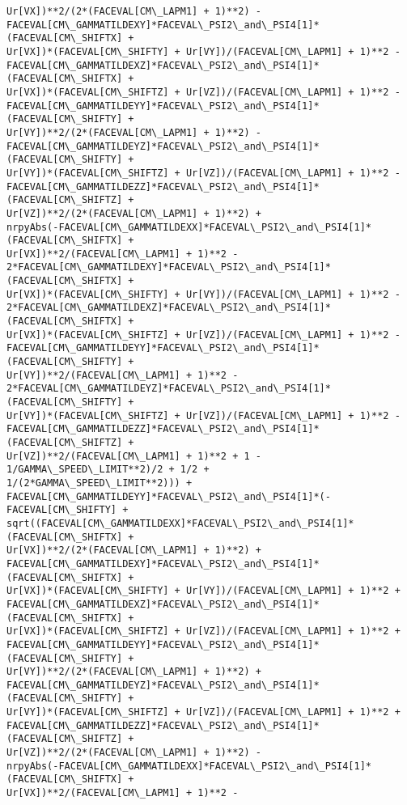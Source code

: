 \documentclass[landscape,letterpaper,10pt,english]{article}
\begin{document}
\begin{Verbatim}[commandchars=\\\{\}]
Ur[VX])**2/(2*(FACEVAL[CM\_LAPM1] + 1)**2) -
FACEVAL[CM\_GAMMATILDEXY]*FACEVAL\_PSI2\_and\_PSI4[1]*(FACEVAL[CM\_SHIFTX] +
Ur[VX])*(FACEVAL[CM\_SHIFTY] + Ur[VY])/(FACEVAL[CM\_LAPM1] + 1)**2 -
FACEVAL[CM\_GAMMATILDEXZ]*FACEVAL\_PSI2\_and\_PSI4[1]*(FACEVAL[CM\_SHIFTX] +
Ur[VX])*(FACEVAL[CM\_SHIFTZ] + Ur[VZ])/(FACEVAL[CM\_LAPM1] + 1)**2 -
FACEVAL[CM\_GAMMATILDEYY]*FACEVAL\_PSI2\_and\_PSI4[1]*(FACEVAL[CM\_SHIFTY] +
Ur[VY])**2/(2*(FACEVAL[CM\_LAPM1] + 1)**2) -
FACEVAL[CM\_GAMMATILDEYZ]*FACEVAL\_PSI2\_and\_PSI4[1]*(FACEVAL[CM\_SHIFTY] +
Ur[VY])*(FACEVAL[CM\_SHIFTZ] + Ur[VZ])/(FACEVAL[CM\_LAPM1] + 1)**2 -
FACEVAL[CM\_GAMMATILDEZZ]*FACEVAL\_PSI2\_and\_PSI4[1]*(FACEVAL[CM\_SHIFTZ] +
Ur[VZ])**2/(2*(FACEVAL[CM\_LAPM1] + 1)**2) +
nrpyAbs(-FACEVAL[CM\_GAMMATILDEXX]*FACEVAL\_PSI2\_and\_PSI4[1]*(FACEVAL[CM\_SHIFTX] +
Ur[VX])**2/(FACEVAL[CM\_LAPM1] + 1)**2 -
2*FACEVAL[CM\_GAMMATILDEXY]*FACEVAL\_PSI2\_and\_PSI4[1]*(FACEVAL[CM\_SHIFTX] +
Ur[VX])*(FACEVAL[CM\_SHIFTY] + Ur[VY])/(FACEVAL[CM\_LAPM1] + 1)**2 -
2*FACEVAL[CM\_GAMMATILDEXZ]*FACEVAL\_PSI2\_and\_PSI4[1]*(FACEVAL[CM\_SHIFTX] +
Ur[VX])*(FACEVAL[CM\_SHIFTZ] + Ur[VZ])/(FACEVAL[CM\_LAPM1] + 1)**2 -
FACEVAL[CM\_GAMMATILDEYY]*FACEVAL\_PSI2\_and\_PSI4[1]*(FACEVAL[CM\_SHIFTY] +
Ur[VY])**2/(FACEVAL[CM\_LAPM1] + 1)**2 -
2*FACEVAL[CM\_GAMMATILDEYZ]*FACEVAL\_PSI2\_and\_PSI4[1]*(FACEVAL[CM\_SHIFTY] +
Ur[VY])*(FACEVAL[CM\_SHIFTZ] + Ur[VZ])/(FACEVAL[CM\_LAPM1] + 1)**2 -
FACEVAL[CM\_GAMMATILDEZZ]*FACEVAL\_PSI2\_and\_PSI4[1]*(FACEVAL[CM\_SHIFTZ] +
Ur[VZ])**2/(FACEVAL[CM\_LAPM1] + 1)**2 + 1 - 1/GAMMA\_SPEED\_LIMIT**2)/2 + 1/2 +
1/(2*GAMMA\_SPEED\_LIMIT**2))) +
FACEVAL[CM\_GAMMATILDEYY]*FACEVAL\_PSI2\_and\_PSI4[1]*(-FACEVAL[CM\_SHIFTY] +
sqrt((FACEVAL[CM\_GAMMATILDEXX]*FACEVAL\_PSI2\_and\_PSI4[1]*(FACEVAL[CM\_SHIFTX] +
Ur[VX])**2/(2*(FACEVAL[CM\_LAPM1] + 1)**2) +
FACEVAL[CM\_GAMMATILDEXY]*FACEVAL\_PSI2\_and\_PSI4[1]*(FACEVAL[CM\_SHIFTX] +
Ur[VX])*(FACEVAL[CM\_SHIFTY] + Ur[VY])/(FACEVAL[CM\_LAPM1] + 1)**2 +
FACEVAL[CM\_GAMMATILDEXZ]*FACEVAL\_PSI2\_and\_PSI4[1]*(FACEVAL[CM\_SHIFTX] +
Ur[VX])*(FACEVAL[CM\_SHIFTZ] + Ur[VZ])/(FACEVAL[CM\_LAPM1] + 1)**2 +
FACEVAL[CM\_GAMMATILDEYY]*FACEVAL\_PSI2\_and\_PSI4[1]*(FACEVAL[CM\_SHIFTY] +
Ur[VY])**2/(2*(FACEVAL[CM\_LAPM1] + 1)**2) +
FACEVAL[CM\_GAMMATILDEYZ]*FACEVAL\_PSI2\_and\_PSI4[1]*(FACEVAL[CM\_SHIFTY] +
Ur[VY])*(FACEVAL[CM\_SHIFTZ] + Ur[VZ])/(FACEVAL[CM\_LAPM1] + 1)**2 +
FACEVAL[CM\_GAMMATILDEZZ]*FACEVAL\_PSI2\_and\_PSI4[1]*(FACEVAL[CM\_SHIFTZ] +
Ur[VZ])**2/(2*(FACEVAL[CM\_LAPM1] + 1)**2) -
nrpyAbs(-FACEVAL[CM\_GAMMATILDEXX]*FACEVAL\_PSI2\_and\_PSI4[1]*(FACEVAL[CM\_SHIFTX] +
Ur[VX])**2/(FACEVAL[CM\_LAPM1] + 1)**2 -

\end{Verbatim}
\end{document}
